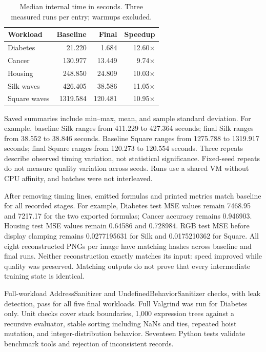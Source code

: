 \documentclass[sigplan,nonacm]{acmart}
\begin{document}
\begin{table}[t]
\caption{Median internal time in seconds. Three measured runs per entry; warmups excluded.}
\label{tab:times}
\centering
\begin{tabular}{lrrr}
\toprule
Workload & Baseline & Final & Speedup \\
\midrule
Diabetes & 21.220 & 1.684 & 12.60$\times$ \\
Cancer & 130.977 & 13.449 & 9.74$\times$ \\
Housing & 248.850 & 24.809 & 10.03$\times$ \\
Silk waves & 426.405 & 38.586 & 11.05$\times$ \\
Square waves & 1319.584 & 120.481 & 10.95$\times$ \\
\bottomrule
\end{tabular}
\end{table}

Saved summaries include min--max, mean, and sample standard deviation. For example, baseline Silk ranges from 411.229 to 427.364 seconds; final Silk ranges from 38.552 to 38.846 seconds. Baseline Square ranges from 1275.788 to 1319.917 seconds; final Square ranges from 120.273 to 120.554 seconds. Three repeats describe observed timing variation, not statistical significance. Fixed-seed repeats do not measure quality variation across seeds. Runs use a shared VM without CPU affinity, and batches were not interleaved.

After removing timing lines, emitted formulas and printed metrics match baseline for all recorded stages. For example, Diabetes test MSE values remain 7468.95 and 7217.17 for the two exported formulas; Cancer accuracy remains 0.946903. Housing test MSE values remain 0.64586 and 0.728984. RGB test MSE before display clamping remains 0.0277195631 for Silk and 0.0175210362 for Square. All eight reconstructed PNGs per image have matching hashes across baseline and final runs. Neither reconstruction exactly matches its input: speed improved while quality was preserved. Matching outputs do not prove that every intermediate training state is identical.

Full-workload AddressSanitizer and UndefinedBehaviorSanitizer checks, with leak detection, pass for all five final workloads. Full Valgrind was run for Diabetes only. Unit checks cover stack boundaries, 1,000 expression trees against a recursive evaluator, stable sorting including NaNs and ties, repeated hoist mutation, and integer-distribution behavior. Seventeen Python tests validate benchmark tools and rejection of inconsistent records.
\end{document}
